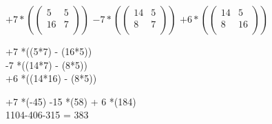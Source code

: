 \vspace{5mm} %

$
+7 *(
\begin{pmatrix}
  5 & 5   \\
  16 & 7  \\
\end{pmatrix}
)
$
$
-7 *(
\begin{pmatrix}
  14 & 5  \\
  8 & 7   \\
\end{pmatrix}
)
$
$
+6 *(
\begin{pmatrix}
  14 & 5  \\
  8 & 16  \\
\end{pmatrix}
)
$

\vspace{5mm} %

+7 *((5*7) - (16*5)) \\

-7 *((14*7) - (8*5)) \\

+6 *((14*16) - (8*5)) \\


\vspace{5mm} %

+7 *(-45) -15 *(58) + 6 *(184) \\

1104-406-315 = 383 \\
